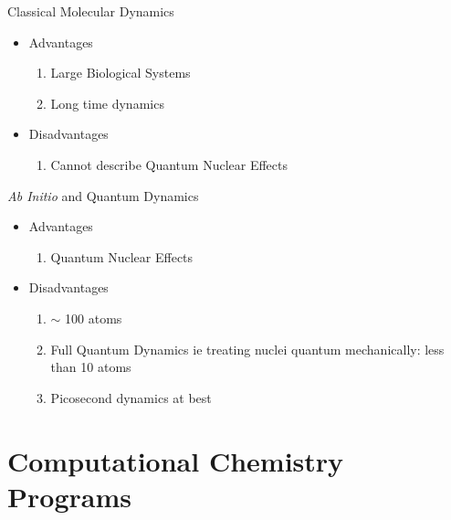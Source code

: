 \documentclass[slidestop,mathserif,compress,xcolor=svgnames]{beamer}
\begin{document}
\begin{frame}
\begin{block}{Classical Molecular Dynamics}
\begin{itemize}
\item Advantages
{\scriptsize
\begin{enumerate}
\item Large Biological Systems
\item Long time dynamics
\end{enumerate}
}
\item Disadvantages
{\footnotesize
\begin{enumerate}
\item Cannot describe Quantum Nuclear Effects
\end{enumerate}
}
\end{itemize}
\end{block}
\begin{block}{\textit{Ab Initio} and Quantum Dynamics}
\begin{itemize}
\item Advantages
{\footnotesize
\begin{enumerate}
\item Quantum Nuclear Effects
\end{enumerate}
}
\item Disadvantages
{\footnotesize
\begin{enumerate}
\item $\sim$ 100 atoms
\item Full Quantum Dynamics ie treating nuclei quantum mechanically: less than 10 atoms
\item Picosecond dynamics at best
\end{enumerate}
}
\end{itemize}
\end{block}
\end{frame}


\section{Computational Chemistry Programs}
\end{document}
